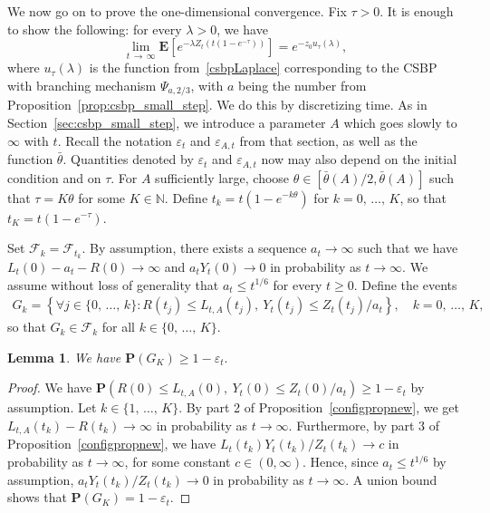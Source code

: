 \documentclass[10pt]{amsart}
\newtheorem{lemm}[theo]{Lemma}\newtheorem{prop}[theo]{Proposition}\newtheorem{coro}[theo]{Corollary}\newtheorem{conj}[theo]{Conjecture}
\theoremstyle{definition}\newtheorem{defi}[theo]{Definition}\newtheorem{rema}[theo]{Remark}\newtheorem{exam}[theo]{Example}\newtheorem{exem}[theo]{Example}\newtheorem{nota}[theo]{Notation}
\newcommand*\eps{\varepsilon}
\newcommand*\E{\mathbf{E}}
\renewcommand*\P{\mathbf{P}}
\newcommand\F{\mathcal{F}}
\newcommand*\N{\mathbb{N}}
\newcommand{\1} {\mathds{1}}
\renewcommand*\to{\rightarrow}
\let\oldforall\forall
\renewcommand*{\forall}{\mathrel{\oldforall}}
\begin{document}
We now go on to prove the one-dimensional convergence. Fix $\tau > 0$. It is enough to show the following: for every $\lambda > 0$, we have
\begin{equation}\label{eq:750}
\lim_{t\,\to\,\infty} \E\left[e^{-\lambda Z_t\left(t\left(1-e^{-\tau}\right)\right)}\right] = e^{-z_0u_\tau(\lambda)},
\end{equation}
where $u_\tau(\lambda)$ is the function from~\eqref{csbpLaplace} corresponding to the CSBP with branching mechanism $\Psi_{a,2/3}$, with $a$ being the number from Proposition~\ref{prop:csbp_small_step}. We do this by discretizing time. As in Section~\ref{sec:csbp_small_step}, we introduce a parameter $A$ which goes slowly to $\infty$ with $t$. Recall the notation $\eps_t$ and $\eps_{A,t}$ from that section, as well as the function $\bar\theta$. Quantities denoted by $\eps_t$ and $\eps_{A,t}$ now may also depend on the initial condition and on $\tau$. For $A$ sufficiently large, choose $\theta\in [\bar{\theta}(A)/2,\bar{\theta}(A)]$ such that $\tau = K\theta$ for some $K\in\N$. Define $t_k = t(1-e^{-k\theta})$ for $k=0,\,\ldots,\,K$, so that $t_K = t(1-e^{-\tau})$.

Set $\F_k = \F_{t_k}$. By assumption, there exists a sequence $a_t\to \infty$ such that we have $L_t(0)-a_t-R(0) \to\infty$ and $a_tY_t(0)\to 0$ in probability as $t\to\infty$. We assume without loss of generality that $a_t \le t^{1/6}$ for every $t\ge0$. Define the events
\begin{align*}
G_k = \left\{\forall j\in\{0,\,\ldots,\,k\}: R(t_j) \le L_{t,A}(t_j),\ Y_t(t_j) \le Z_t(t_j)/a_t\right\},\quad k=0,\,\ldots,\,K,
\end{align*}
so that $G_k\in \F_k$ for all $k\in\{0,\,\ldots,\,K\}$.
\begin{lemm}\label{lem:Gk}
We have
\(
\P(G_K) \ge 1-\eps_t.
\)
\end{lemm}

\begin{proof}
We have $\P(R(0) \le L_{t,A}(0),\ Y_t(0) \le Z_t(0)/a_t)\ge 1-\eps_t$ by assumption. Let $k\in\{1,\,\ldots,\,K\}$. By part 2 of Proposition~\ref{configpropnew}, we get $L_{t,A}(t_k) - R(t_k) \to \infty$ in probability as $t\to\infty$. Furthermore, by part 3 of Proposition~\ref{configpropnew}, we have $L_t(t_k)Y_t(t_k)/Z_t(t_k)\to c$ in probability as $t\to\infty$, for some constant $c\in(0,\infty)$. Hence, since $a_t \le t^{1/6}$ by assumption, $a_t Y_t(t_k)/Z_t(t_k)\to 0$ in probability as $t\to\infty$. A union bound shows that $\P(G_K) = 1-\eps_t$.
\end{proof}
\end{document}

